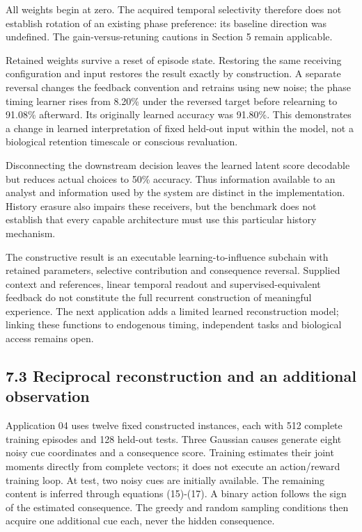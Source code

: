\documentclass[
  american,
  11pt,
  letterpaper,
]{article}
\begin{document}
All weights begin at zero. The acquired temporal selectivity therefore does not establish rotation of an existing phase preference: its baseline direction was undefined. The gain-versus-retuning cautions in Section 5 remain applicable.

Retained weights survive a reset of episode state. Restoring the same receiving configuration and input restores the result exactly by construction. A separate reversal changes the feedback convention and retrains using new noise; the phase timing learner rises from 8.20\% under the reversed target before relearning to 91.08\% afterward. Its originally learned accuracy was 91.80\%. This demonstrates a change in learned interpretation of fixed held-out input within the model, not a biological retention timescale or conscious revaluation.

Disconnecting the downstream decision leaves the learned latent score decodable but reduces actual choices to 50\% accuracy. Thus information available to an analyst and information used by the system are distinct in the implementation. History erasure also impairs these receivers, but the benchmark does not establish that every capable architecture must use this particular history mechanism.

The constructive result is an executable learning-to-influence subchain with retained parameters, selective contribution and consequence reversal. Supplied context and references, linear temporal readout and supervised-equivalent feedback do not constitute the full recurrent construction of meaningful experience. The next application adds a limited learned reconstruction model; linking these functions to endogenous timing, independent tasks and biological access remains open.

\subsection{7.3 Reciprocal reconstruction and an additional observation}\label{reciprocal-reconstruction-and-an-additional-observation}

Application 04 uses twelve fixed constructed instances, each with 512 complete training episodes and 128 held-out tests. Three Gaussian causes generate eight noisy cue coordinates and a consequence score. Training estimates their joint moments directly from complete vectors; it does not execute an action/reward training loop. At test, two noisy cues are initially available. The remaining content is inferred through equations (15)-(17). A binary action follows the sign of the estimated consequence. The greedy and random sampling conditions then acquire one additional cue each, never the hidden consequence.
\end{document}
